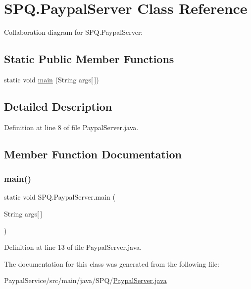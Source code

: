 \hypertarget{class_s_p_q_1_1_paypal_server}{}\section{S\+P\+Q.\+Paypal\+Server Class Reference}
\label{class_s_p_q_1_1_paypal_server}


Collaboration diagram for S\+P\+Q.\+Paypal\+Server\+:
\subsection*{Static Public Member Functions}
\begin{DoxyCompactItemize}
\item 
static void \mbox{\hyperlink{class_s_p_q_1_1_paypal_server_aa704ce67562c143df7cdaf34f74f59ac}{main}} (String args\mbox{[}$\,$\mbox{]})
\end{DoxyCompactItemize}


\subsection{Detailed Description}


Definition at line 8 of file Paypal\+Server.\+java.



\subsection{Member Function Documentation}
\mbox{\label{class_s_p_q_1_1_paypal_server_aa704ce67562c143df7cdaf34f74f59ac}} 
\subsubsection{\texorpdfstring{main()}{main()}}
{\footnotesize\ttfamily static void S\+P\+Q.\+Paypal\+Server.\+main (\begin{DoxyParamCaption}\item[{String}]{args\mbox{[}$\,$\mbox{]} }\end{DoxyParamCaption})\hspace{0.3cm}{\ttfamily [static]}}



Definition at line 13 of file Paypal\+Server.\+java.



The documentation for this class was generated from the following file\+:\begin{DoxyCompactItemize}
\item 
Paypal\+Service/src/main/java/\+S\+P\+Q/\mbox{\hyperlink{_paypal_server_8java}{Paypal\+Server.\+java}}\end{DoxyCompactItemize}

